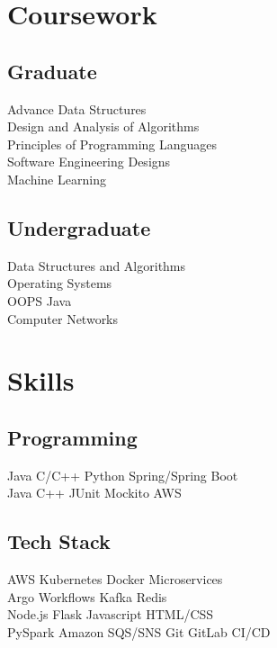 \documentclass[]{deedy-resume-openfont}
\begin{document}
\begin{minipage}[t]{0.33\textwidth}

        \section{Coursework}
        \subsection{Graduate}
        Advance Data Structures \\
        Design and Analysis of Algorithms \\
        Principles of Programming Languages \\
        Software Engineering Designs\\
        Machine Learning \\

        \sectionsep

        \subsection{Undergraduate}
        Data Structures and Algorithms \\
        Operating Systems \\
        OOPS Java \\
        Computer Networks\\


        \section{Skills}
        \subsection{Programming}
        Java \textbullet{} C/C++ \textbullet{} Python \textbullet{} Spring/Spring Boot\\
        Java \textbullet{} C++ \textbullet{} JUnit \textbullet{} Mockito \textbullet{} AWS

        \sectionsep
        \subsection{Tech Stack}
        AWS \textbullet{} Kubernetes \textbullet{} Docker \textbullet{} Microservices \\
        Argo Workflows \textbullet{} Kafka \textbullet{} Redis \\ \textbullet{} Node.js \textbullet{} Flask  \textbullet{} Javascript \textbullet{} HTML/CSS \\
        PySpark \textbullet{} Amazon SQS/SNS \textbullet{} Git \textbullet{} GitLab CI/CD


\end{minipage}
\end{document}

